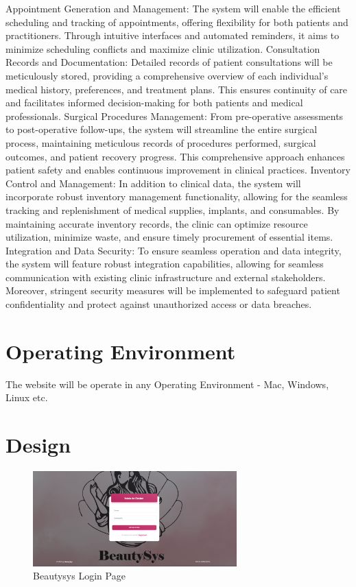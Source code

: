 \documentclass{scrreprt}
\begin{document}
Appointment Generation and Management:
The system will enable the efficient scheduling and tracking of appointments, offering flexibility for both patients and practitioners. Through intuitive interfaces and automated reminders, it aims to minimize scheduling conflicts and maximize clinic utilization.
\newline
Consultation Records and Documentation:
Detailed records of patient consultations will be meticulously stored, providing a comprehensive overview of each individual's medical history, preferences, and treatment plans. This ensures continuity of care and facilitates informed decision-making for both patients and medical professionals.
\newline
Surgical Procedures Management:
From pre-operative assessments to post-operative follow-ups, the system will streamline the entire surgical process, maintaining meticulous records of procedures performed, surgical outcomes, and patient recovery progress. This comprehensive approach enhances patient safety and enables continuous improvement in clinical practices.
\newline
Inventory Control and Management:
In addition to clinical data, the system will incorporate robust inventory management functionality, allowing for the seamless tracking and replenishment of medical supplies, implants, and consumables. By maintaining accurate inventory records, the clinic can optimize resource utilization, minimize waste, and ensure timely procurement of essential items.
\newline
Integration and Data Security:
To ensure seamless operation and data integrity, the system will feature robust integration capabilities, allowing for seamless communication with existing clinic infrastructure and external stakeholders. Moreover, stringent security measures will be implemented to safeguard patient confidentiality and protect against unauthorized access or data breaches.

\section{Operating Environment}
The website will be operate in any Operating Environment - Mac, Windows, Linux etc. 

\section{Design}

\begin{figure}[H]
    \centering
    \includegraphics[width=0.7\textwidth]{img/Login_Page.png}
    \caption{Beautysys Login Page}
\end{figure}
\end{document}
